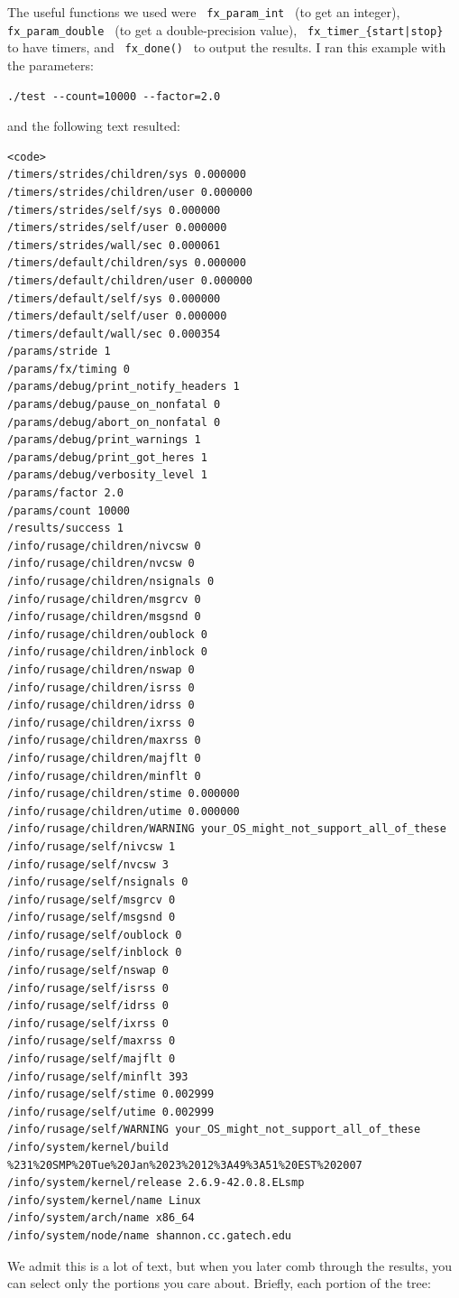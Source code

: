 \documentclass[letter]{report}
\begin{document}
The useful functions we used were \verb= fx_param_int = (to get an integer), \verb= fx_param_double = (to get a double-precision value), \verb= fx_timer_{start|stop} = to have timers, and \verb= fx_done() = to output the results. I ran this example with the parameters:
\begin{verbatim}
./test --count=10000 --factor=2.0
\end{verbatim}
and the following text resulted:
\begin{verbatim}
<code>
/timers/strides/children/sys 0.000000
/timers/strides/children/user 0.000000
/timers/strides/self/sys 0.000000
/timers/strides/self/user 0.000000
/timers/strides/wall/sec 0.000061
/timers/default/children/sys 0.000000
/timers/default/children/user 0.000000
/timers/default/self/sys 0.000000
/timers/default/self/user 0.000000
/timers/default/wall/sec 0.000354
/params/stride 1
/params/fx/timing 0
/params/debug/print_notify_headers 1
/params/debug/pause_on_nonfatal 0
/params/debug/abort_on_nonfatal 0
/params/debug/print_warnings 1
/params/debug/print_got_heres 1
/params/debug/verbosity_level 1
/params/factor 2.0
/params/count 10000
/results/success 1
/info/rusage/children/nivcsw 0
/info/rusage/children/nvcsw 0
/info/rusage/children/nsignals 0
/info/rusage/children/msgrcv 0
/info/rusage/children/msgsnd 0
/info/rusage/children/oublock 0
/info/rusage/children/inblock 0
/info/rusage/children/nswap 0
/info/rusage/children/isrss 0
/info/rusage/children/idrss 0
/info/rusage/children/ixrss 0
/info/rusage/children/maxrss 0
/info/rusage/children/majflt 0
/info/rusage/children/minflt 0
/info/rusage/children/stime 0.000000
/info/rusage/children/utime 0.000000
/info/rusage/children/WARNING your_OS_might_not_support_all_of_these
/info/rusage/self/nivcsw 1
/info/rusage/self/nvcsw 3
/info/rusage/self/nsignals 0
/info/rusage/self/msgrcv 0
/info/rusage/self/msgsnd 0
/info/rusage/self/oublock 0
/info/rusage/self/inblock 0
/info/rusage/self/nswap 0
/info/rusage/self/isrss 0
/info/rusage/self/idrss 0
/info/rusage/self/ixrss 0
/info/rusage/self/maxrss 0
/info/rusage/self/majflt 0
/info/rusage/self/minflt 393
/info/rusage/self/stime 0.002999
/info/rusage/self/utime 0.002999
/info/rusage/self/WARNING your_OS_might_not_support_all_of_these
/info/system/kernel/build %231%20SMP%20Tue%20Jan%2023%2012%3A49%3A51%20EST%202007
/info/system/kernel/release 2.6.9-42.0.8.ELsmp
/info/system/kernel/name Linux
/info/system/arch/name x86_64
/info/system/node/name shannon.cc.gatech.edu
\end{verbatim}
We admit this is a lot of text, but when you later comb through the results, you can select only the portions you care about. Briefly, each portion of the tree:
\end{document}
